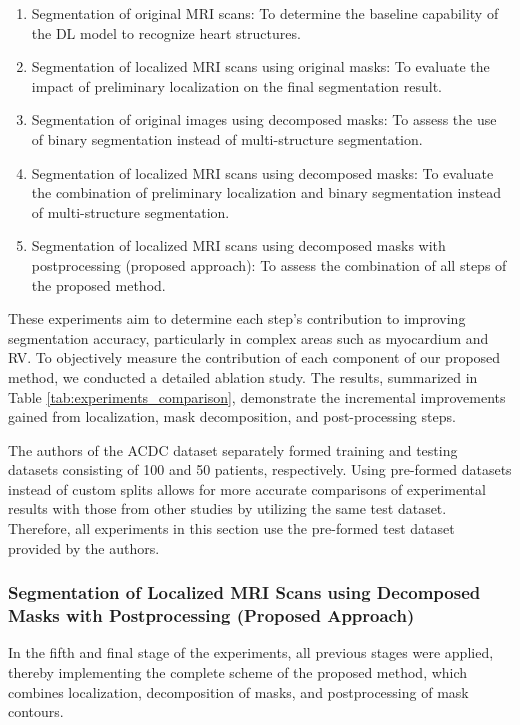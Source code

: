 \documentclass[fleqn,10pt]{wlscirep}
\begin{document}
\begin{enumerate}
    \item Segmentation of original MRI scans: To determine the baseline capability of the DL model to recognize heart structures.
    \item Segmentation of localized MRI scans using original masks: To evaluate the impact of preliminary localization on the final segmentation result.
    \item Segmentation of original images using decomposed masks: To assess the use of binary segmentation instead of multi-structure segmentation.
    \item Segmentation of localized MRI scans using decomposed masks: To evaluate the combination of preliminary localization and binary segmentation instead of multi-structure segmentation.
    \item Segmentation of localized MRI scans using decomposed masks with postprocessing (proposed approach): To assess the combination of all steps of the proposed method.
\end{enumerate}

These experiments aim to determine each step’s contribution to improving segmentation accuracy, particularly in complex areas such as myocardium and RV.
To objectively measure the contribution of each component of our proposed method, we conducted a detailed ablation study. The results, summarized in Table \ref{tab:experiments_comparison}, demonstrate the incremental improvements gained from localization, mask decomposition, and post-processing steps.

The authors of the ACDC dataset \cite{Bernard:2018} separately formed training and testing datasets consisting of 100 and 50 patients, respectively. Using pre-formed datasets instead of custom splits allows for more accurate comparisons of experimental results with those from other studies by utilizing the same test dataset. Therefore, all experiments in this section use the pre-formed test dataset provided by the authors.

\subsubsection*{Segmentation of Localized MRI Scans using Decomposed Masks with Postprocessing (Proposed Approach)}

In the fifth and final stage of the experiments, all previous stages were applied, thereby implementing the complete scheme of the proposed method, which combines localization, decomposition of masks, and postprocessing of mask contours.
\end{document}
